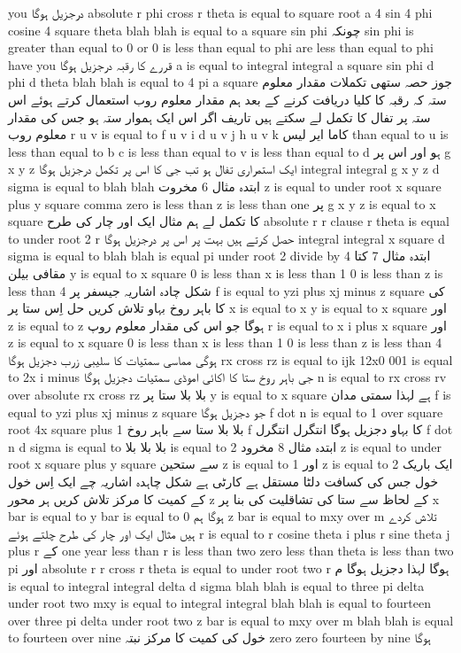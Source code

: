 you درجزیل ہوگا absolute r phi cross r theta is equal to square root a 4 sin 4 phi cosine 4 square theta blah blah is equal to a square sin phi
چونکہ sin phi is greater than equal to 0 or 0 is less than equal to phi are less than equal to phi have
you قررے کا رقبہ درجزیل ہوگا a is equal to integral integral a square sin phi d phi d theta blah blah is equal to 4 pi a square
جوز حصہ ستھی تکملات مقدار معلوم ستہ
کہ رقبہ کا کلیا دریافت کرنے کے بعد
ہم مقدار معلوم روب استعمال کرتے ہوئے اس ستہ پر تفال کا تکمل لے سکتے ہیں
تاریف اگر اس ایک ہموار ستہ ہو جس کی مقدار معلوم روب r u v is equal to f u v i d u v j h u v k
کاما ایر لیس than equal to u is less than equal to b c is less than equal to v is less than equal to d ہو
اور اس پر g x y z ایک استمراری تفال ہو تب جی کا اس پر تکمل درجزیل ہوگا integral integral g x y z d sigma is equal to blah blah
ابتدہ مثال 6 مخروت z is equal to under root x square plus y square comma zero is less than z is less than one
پر g x y z is equal to x square کا تکمل لے
ہم مثال ایک اور چار کی طرح absolute r r clause r theta is equal to under root 2 r حصل کرتے ہیں
بہت پر اس پر درجزیل ہوگا integral integral x square d sigma is equal to blah blah is equal pi under root 2 divide by 4
ابتدہ مثال 7
کتا مقافی بیلن y is equal to x square 0 is less than x is less than 1 0 is less than
z is less than 4 شکل چادہ اشاریہ جیسفر پر f is equal to yzi plus xj minus z square
کی کا باہر روخ بہاو تلاش کریں حل اِس ستا پر x is equal to x y is equal to x square
اور z is equal to z ہوگا جو اس کی مقدار معلوم روپ r is equal to x i plus x square
اور z is equal to x square 0 is less than x is less than 1 0 is less than z is less than 4 ہوگی
مماسی سمتیات کا سلیبی زرب دجزیل ہوگا rx cross rz is equal to ijk 12x0 001 is equal to 2x i minus
جی باہر روخ ستا کا اکائی اموڈی سمتیات دجزیل ہوگا n is equal to rx cross rv over absolute rx cross rz
بلا بلا ستا پر y is equal to x square ہے لہذا سمتی مدان f is equal to yzi plus xj minus z square
جو دجزیل ہوگا f dot n is equal to 1 over square root 4x square plus 1 بلا بلا ستا سے باہر روخ f کا بہاو دجزیل ہوگا
انتگرل انتگرل f dot n d sigma is equal to بلا بلا بلا is equal to 2
ابتدہ مثال 8 مخرود z is equal to under root x square plus y square سے ستحین z is equal to 1 اور z is equal to 2
ایک باریک خول جس کی کسافت دلٹا مستقل ہے کارٹی ہے شکل چاہدہ اشاریہ چے ایک اِس خول کے کمیت کا مرکز تلاش کریں
ہر محور z کے لحاظ سے ستا کی تشاقلیت کی بنا پر x bar is equal to y bar is equal to 0 ہوگا
ہم z bar is equal to mxy over m تلاش کردے ہیں
مثال ایک اور چار کی طرح چلتے ہوئے r is equal to r cosine theta i plus r sine theta j plus r کے one year less than r is less than two zero less than theta is less than two pi اور absolute r r cross r theta is equal to under root two r ہوگا لہذا دجزیل ہوگا
م is equal to integral integral delta d sigma blah blah is equal to three pi delta under root two mxy is equal to integral integral blah blah is equal to fourteen over three pi delta under root two z bar is equal to mxy over m blah blah is equal to fourteen over nine
خول کی کمیت کا مرکز نبتہ zero zero fourteen by nine ہوگا
